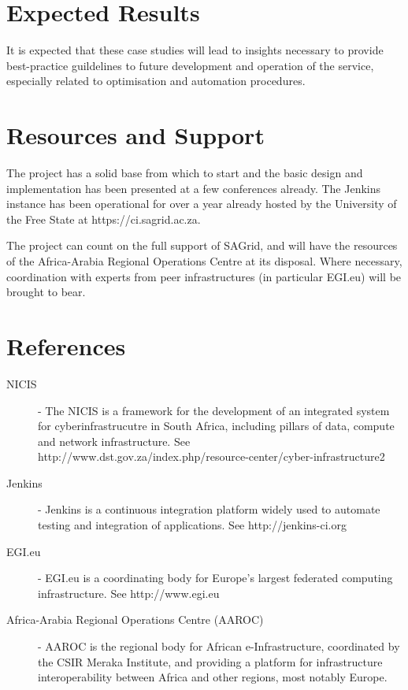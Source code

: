 \documentclass[oneside, a4paper, onecolumn, 11pt]{article}
\begin{document}
\section{Expected Results}

It is expected that these case studies will lead to insights necessary to provide best-practice guildelines to future development and operation of the service, especially related to optimisation and automation procedures.

\section{Resources and Support}

The project has a solid base from which to start and the basic design and implementation has been presented at a few conferences already. The Jenkins instance has been operational for over a year already hosted by the University of the Free State at https://ci.sagrid.ac.za.

The project can count on the full support of SAGrid, and will have the resources of the Africa-Arabia Regional Operations Centre at its disposal. Where necessary, coordination with experts from peer infrastructures (in particular EGI.eu) will be brought to bear.


\section{References}

\begin{description}
  \item[NICIS] - The NICIS is a framework for the development of an integrated system for cyberinfrastrucutre in South Africa, including pillars of data, compute and network infrastructure. See http://www.dst.gov.za/index.php/resource-center/cyber-infrastructure2
  \item[Jenkins] - Jenkins is a continuous integration platform widely used to automate testing and integration of applications. See http://jenkins-ci.org
  \item[EGI.eu] - EGI.eu is a coordinating body for Europe's largest federated computing infrastructure. See http://www.egi.eu
  \item[Africa-Arabia Regional Operations Centre (AAROC)] - AAROC is the regional body for African e-Infrastructure, coordinated by the CSIR Meraka Institute, and providing a platform for infrastructure interoperability between Africa and other regions, most notably Europe.
\end{description}

\begin{small}

\end{small}
\end{document}
